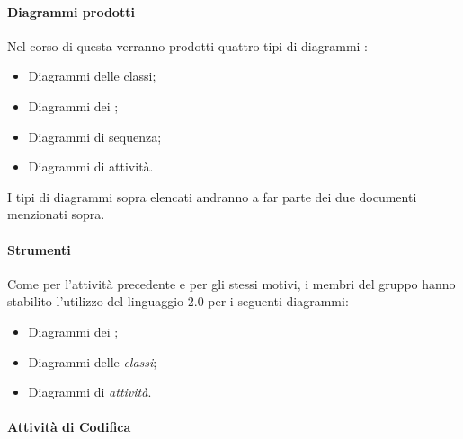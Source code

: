                         \paragraph*{Diagrammi prodotti}
                        Nel corso di questa  verranno prodotti quattro tipi di diagrammi :
                        \begin{itemize}
                        \item Diagrammi delle classi;
                        \item Diagrammi dei ;
                        \item Diagrammi di sequenza;
                        \item Diagrammi di attivit\`a.
                        \end{itemize}
                        I tipi di diagrammi sopra elencati andranno a far parte dei due documenti menzionati sopra.
		
		 
		        \paragraph*{Strumenti}
		        Come per l'attivit\`a precedente e per gli stessi motivi, i membri del gruppo hanno stabilito l'utilizzo del linguaggio  2.0 per i seguenti
		        diagrammi:
		        \begin{itemize}
			\item Diagrammi dei ; 
			\item Diagrammi delle \textit{classi};	
			\item Diagrammi di \textit{attivit\`a}.
		        \end{itemize}
			 
		
		\paragraph*{Attività di Codifica}
